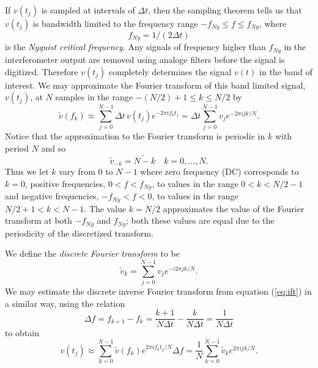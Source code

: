 If $v(t_j)$ is sampled at intervals of $\Delta t$, then the sampling
theorem\cite{Press:1992} tells us that $v(t_j)$ is bandwidth limited to the
frequency range $-f_{Ny} \le f \le f_{Ny}$, where
\begin{equation}
f_{Ny} = 1/(2\Delta t)
\end{equation}
is the \emph{Nyquist critical frequency}. Any signals of frequency higher than
$f_{Ny}$ in the interferometer output are removed using analoge filters before
the signal is digitized. Therefore $v(t_j)$ completely determines the signal
$v(t)$ in the band of interest. We may approximate the Fourier transform of
this band limited signal, $v(t_j)$, at $N$ samples in the range 
$-(N/2)+1 \le k \le N/2$ by
\begin{equation}
\tilde{v}(f_k) \approx \sum_{j=0}^{N-1} \Delta t\, v(t_j) e^{-2 \pi i f_k t_j}
= \Delta t \sum_{j=0}^{N-1} v_j e^{-2 \pi i j k / N}.
\label{eq:fftapprox}
\end{equation}
Notice that the approximation to the Fourier transform is periodic in $k$ with
period $N$ and so 
\begin{equation}
\tilde{v}_{-k} = \tilde{N-k}\quad k = 0, \ldots, N.
\end{equation}
Thus we let $k$ vary from $0$ to $N-1$ where zero frequency (DC) corresponds
to $k=0$, positive frequencies, $0 < f < f_{Ny}$, to values in the range $0 <
k < N/2-1$ and negative frequencies, $-f_{Ny} < f < 0$, to values in the range $N/2+1 <
k < N-1$. The value $k = N/2$ approximates the value of the Fourier
transform at both $-f_{Ny}$ and $f_{Ny}$; both these values are equal due to
the periodicity of the discretized transform.

We define the \emph{discrete Fourier transform} to be\cite{Anderson:2001a}
\begin{equation}
\tilde{v}_k = \sum_{j=0}^{N-1} v_j e^{-i 2 \pi j k / N}.
\label{eq:dftdef}
\end{equation}
We may estimate the discrete inverse Fourier transform from equation
(\ref{eq:ift}) in a similar way, using the relation
\begin{equation}
\Delta f = f_{k+1} - f_k = \frac{k+1}{N\Delta t} - \frac{k}{N\Delta t} =
\frac{1}{N\Delta t}
\end{equation}
to obtain
\begin{equation}
v(t_j) \approx \sum_{k=0}^{N-1} \tilde{v}(f_k) e^{2 \pi i f_k t_j / N} \Delta f
= \frac{1}{N} \sum_{k=0}^{N-1} \tilde{v}_k e^{2 \pi i j k / N}.
\end{equation}

